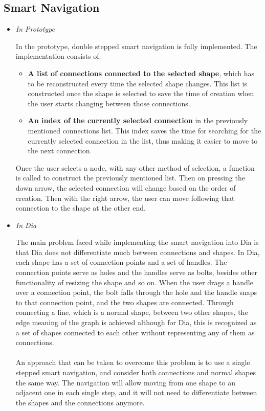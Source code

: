 \subsection{Smart Navigation}
\begin{itemize}
\item {\it In Prototype}
\par \noindent
In the prototype, double stepped smart navigation is fully implemented. 
The implementation consists of:
\begin{itemize}
\item {\bf A list of connections connected to the selected shape}, which has to be reconstructed every time the selected shape changes. This list is constructed once the shape is selected to save the time of creation when the user starts changing between those connections.
\item {\bf An index of the currently selected connection} in the previously mentioned connections list. This index saves the time for searching for the currently selected connection in the list, thus making it easier to move to the next connection.
\end{itemize}
Once the user selects a node, with any other method of selection, a function is called to construct the previously mentioned list. Then on pressing the down arrow, the selected connection will change based on the order of creation. Then with the right arrow, the user can move following that connection to the shape at the other end.


\item {\it In Dia}
\par \noindent
The main problem faced while implementing the smart navigation into Dia is that Dia does not differentiate much between connections and shapes. In Dia, each shape has a set of connection points and a set of handles. The connection points serve as holes and the handles serve as bolts, besides other functionality of resizing the shape and so on. When the user drags a handle over a connection point, the bolt falls through the hole and the handle snaps to that connection point, and the two shapes are connected. Through connecting a line, which is a normal shape, between two other shapes, the edge meaning of the graph is achieved although for Dia, this is recognized as a set of shapes connected to each other without representing any of them as connections.

\paragraph{}
An approach that can be taken to overcome this problem is to use a single stepped smart navigation, and consider both connections and normal shapes the same way. The navigation will allow moving from one shape to an adjacent one in each single step, and it will not need to differentiate between the shapes and the connections anymore.


\end{itemize}
